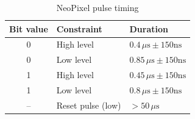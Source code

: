 \begin{table}[h]
	\centering
	\begin{tabular}{cll}
		\toprule
		\textbf{Bit value} & \textbf{Constraint} & \textbf{Duration} \\
		\midrule
		0 & High level & $0.4\,\mu\mathrm{s}\pm150\mathrm{ns}$ \\
		0 & Low level & $0.85\,\mu\mathrm{s}\pm150\mathrm{ns}$ \\
		1 & High level & $0.45\,\mu\mathrm{s}\pm150\mathrm{ns}$ \\
		1 & Low level & $0.8\,\mu\mathrm{s}\pm150\mathrm{ns}$ \\
		-- & Reset pulse (low) & $>50\,\mu\mathrm{s}$ \\
		\bottomrule
	\end{tabular}
	\caption{\label{fig:ws2812_dia}NeoPixel pulse timing}
\end{table}




